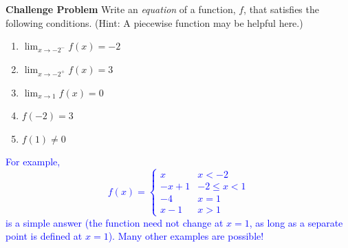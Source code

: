 \documentclass{ximera}
\begin{document}
\begin{exercise}
    \textbf{Challenge Problem} Write an \textit{equation} of a function, $f$, that satisfies the following conditions.  (Hint: A piecewise function may be helpful here.)
    \begin{enumerate}
        \item $\displaystyle\lim_{x\rightarrow -2^-}f(x)=-2$
        \item $\displaystyle \lim_{x\rightarrow -2^+}f(x)=3$
        \item $\displaystyle \lim_{x\rightarrow 1}f(x)=0$
        \item $f(-2)=3$
        \item $f(1)\neq 0$
    \end{enumerate}

    \textcolor{blue}{For example, \[f(x)=\begin{cases}
    x & x<-2\\
    -x+1 & -2\leq x<1\\
    -4 & x=1\\
    x-1 & x>1
    \end{cases}\]}
    \textcolor{blue}{is a simple answer (the function need not change at $x=1$, as long as a separate point is defined at $x=1$).  Many other examples are possible!}
\end{exercise}
\end{document}
